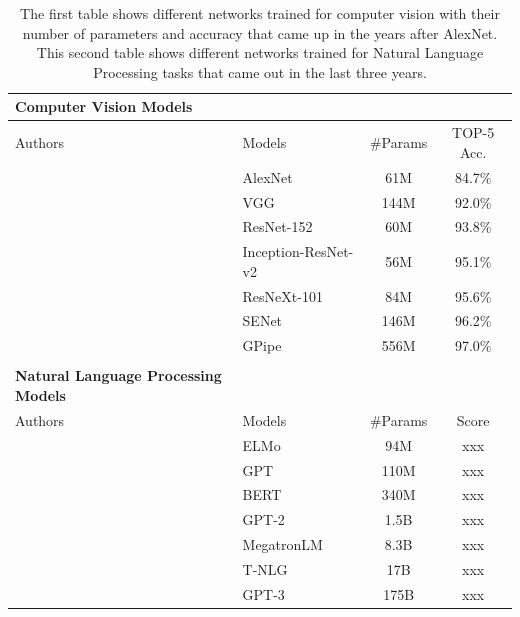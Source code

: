 \begin{table}[t]
  \centering
    {\small
    \begin{tabular}{llcc}
      \textbf{Computer Vision Models} & & & \\
      \toprule
      Authors & Models & \#Params & TOP-5 Acc. \\
      \midrule
      \citet{krizhevsky2012imagenet} & AlexNet~ & 61M & 84.7\% \\
      \citet{simonyan2014very} & VGG & 144M & 92.0\% \\
      \citet{he2016deep} & ResNet-152 & 60M & 93.8\% \\
      \citet{szegedy2017inception} & Inception-ResNet-v2 & 56M & 95.1\% \\
      \citet{xie2017aggregated} & ResNeXt-101 & 84M & 95.6\% \\
      \citet{hu2018squeeze} & SENet & 146M & 96.2\% \\
      \citet{huang2019gpipe} & GPipe & 556M & 97.0\% \\
      \bottomrule \\
      \textbf{Natural Language Processing Models} & & & \\
      \toprule
      Authors & Models & \#Params & Score \\
      \midrule
      \citet{peters2018deep} & ELMo & 94M & xxx \\
      \citet{radford2018improving} & GPT & 110M & xxx \\
      \citet{devlin2019bert} & BERT & 340M & xxx \\
      \citet{radford2019language} & GPT-2 & 1.5B & xxx \\
      \citet{shoeybi2019megatron} & MegatronLM & 8.3B & xxx \\
      \citet{rosset2020turingnlg} & T-NLG & 17B & xxx \\
      \citet{brown2020language} & GPT-3 & 175B & xxx \\
      \bottomrule
    \end{tabular}
    }
    \caption{The first table shows different networks trained for computer vision with their number of parameters and accuracy that came up in the years after AlexNet. This second table shows different networks trained for Natural Language Processing tasks that came out in the last three years.}
  \label{table:ch1-networks_parameters}
\end{table}

